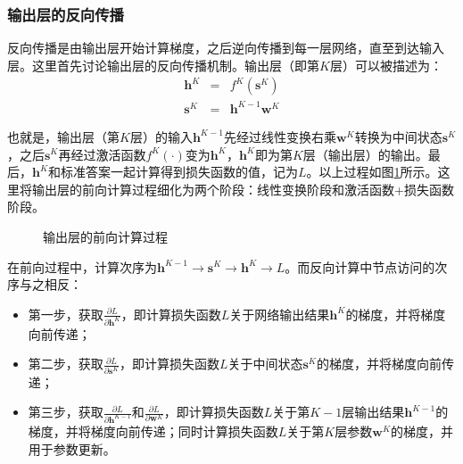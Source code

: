 
\subsubsection{输出层的反向传播}

\parinterval  反向传播是由输出层开始计算梯度，之后逆向传播到每一层网络，直至到达输入层。这里首先讨论输出层的反向传播机制。输出层（即第$ K $层）可以被描述为：
\begin{eqnarray}
\mathbf h^K&=&f^K(\mathbf s^K)\label{eq:5-47}\\
\mathbf s^K&=&\mathbf h^{K-1}\mathbf w^K
\label{eq:5-48}
\end{eqnarray}

\noindent  也就是，输出层（第$ K $层）的输入$ \mathbf h^{K-1} $先经过线性变换右乘$ \mathbf w^K $转换为中间状态$ \mathbf s^K $，之后$ \mathbf s^K $再经过激活函数$ f^K(\cdot) $变为$ \mathbf h^K $，$ \mathbf h^K $即为第$ K $层（输出层）的输出。最后，$ \mathbf h^K $和标准答案一起计算得到损失函数的值，记为$ L $。以上过程如图\ref{fig:5-53}所示。这里将输出层的前向计算过程细化为两个阶段：线性变换阶段和激活函数+损失函数阶段。

\begin{figure}[htp]
\centering

\caption{输出层的前向计算过程}
\label{fig:5-53}
\end{figure}

\parinterval  在前向过程中，计算次序为$ \mathbf h^{K-1}\rightarrow \mathbf s^K\rightarrow \mathbf h^K  \rightarrow L $。而反向计算中节点访问的次序与之相反：


\begin{itemize}
\vspace{0.5em}
\item 第一步，获取$ \frac{\partial L}{\partial \mathbf h^K} $，即计算损失函数$ L $关于网络输出结果$ \mathbf h^K $的梯度，并将梯度向前传递；
\vspace{0.5em}
\item 第二步，获取$ \frac{\partial L}{\partial \mathbf s^K} $，即计算损失函数$ L $关于中间状态$ \mathbf s^K $的梯度，并将梯度向前传递；
\vspace{0.5em}
\item 第三步，获取$ \frac{\partial L}{\partial \mathbf h^{K-1}} $和$ \frac{\partial L}{\partial \mathbf w^K} $，即计算损失函数$ L $关于第$ K-1 $层输出结果$ \mathbf h^{K-1} $的梯度，并将梯度向前传递；同时计算损失函数$ L $关于第$K$层参数$ \mathbf w^K $的梯度，并用于参数更新。
\vspace{0.5em}
\end{itemize}

